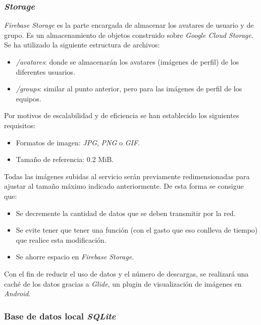 \documentclass[twoside]{report}
\begin{document}
\subsubsection{\textit{Storage}}

\textit{Firebase Storage} es la parte encargada de almacenar los avatares de usuario y de grupo. Es un almacenamiento de objetos construido sobre \textit{Google Cloud Storage}. \\

Se ha utilizado la siguiente estructura de archivos:
\begin{itemize}

\item \textit{/avatares}: donde se almacenarán los avatares (imágenes de perfil) de los diferentes usuarios. 

\item \textit{/groups}: similar al punto anterior, pero para las imágenes de perfil de los equipos. 

\end{itemize}


Por motivos de escalabilidad y de eficiencia se han establecido los siguientes requisitos:
\begin{itemize}
\item Formatos de imagen: \textit{JPG}, \textit{PNG} o \textit{GIF}.
\item Tamaño de referencia: 0.2 MiB.
\end{itemize}

Todas las imágenes subidas al servicio serán previamente redimensionadas para ajustar al tamaño máximo indicado anteriormente. De esta forma se consigue que:

\begin{itemize}
\item Se decremente la cantidad de datos que se deben transmitir por la red.
\item Se evite tener que tener una función (con el gasto que eso conlleva de tiempo) que realice esta modificación.
\item Se ahorre espacio en \textit{Firebase Storage}.
\end{itemize}

Con el fin de reducir el uso de datos y el número de descargas, se realizará una caché de los datos gracias a \textit{Glide}, un plugin de visualización de imágenes en \textit{Android}.

\subsubsection{Base de datos local \textit{SQLite}}
\end{document}
